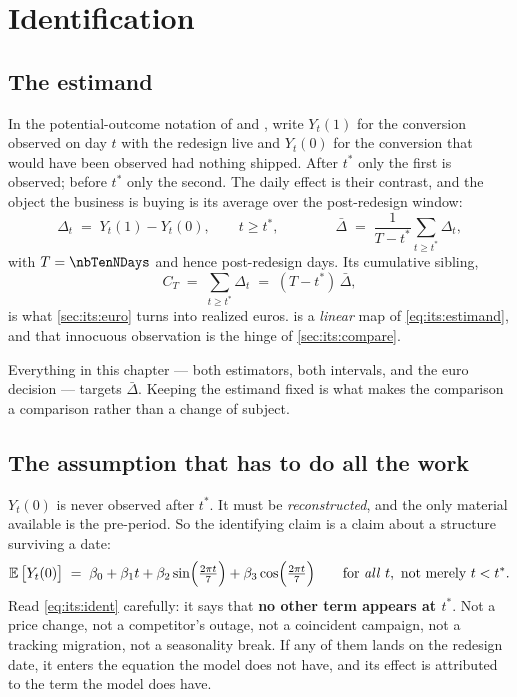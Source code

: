 

\section{Identification}
\label{sec:its:ident}

\subsection*{The estimand}

In the potential-outcome notation of \citet{rubin1974} and \citet{imbens2015}, write $Y_t(1)$ for
the conversion observed on day $t$ with the redesign live and $Y_t(0)$ for the conversion that
would have been observed had nothing shipped. After $t^{*}$ only the first is observed; before
$t^{*}$ only the second. The daily effect is their contrast, and the object the business is buying
is its average over the post-redesign window:
%
\begin{equation}
  \Delta_t \;=\; Y_t(1) - Y_t(0), \qquad t \ge t^{*},
  \qquad\qquad
  \bar\Delta \;=\; \frac{1}{T - t^{*}} \sum_{t \ge t^{*}} \Delta_t ,
  \label{eq:its:estimand}
\end{equation}
%
with $T = \nbTenNDays$ and hence \nbTenNPost{} post-redesign days. Its cumulative sibling,
%
\begin{equation}
  C_T \;=\; \sum_{t \ge t^{*}} \Delta_t \;=\; (T - t^{*})\,\bar\Delta ,
  \label{eq:its:cum}
\end{equation}
%
is what \cref{sec:its:euro} turns into realized euros.  is a \emph{linear} map of
\cref{eq:its:estimand}, and that innocuous observation is the hinge of \cref{sec:its:compare}.

Everything in this chapter --- both estimators, both intervals, and the euro decision --- targets
$\bar\Delta$. Keeping the estimand fixed is what makes the comparison a comparison rather than a
change of subject.

\subsection*{The assumption that has to do all the work}

$Y_t(0)$ is never observed after $t^{*}$. It must be \emph{reconstructed}, and the only material
available is the pre-period. So the identifying claim is a claim about a structure surviving a
date:
%
\begin{equation}
  \operatorname{\mathbb{E}}\big[Y_t(0)\big] \;=\; \beta_0 + \beta_1 t + \beta_2 \sin\!\Big(\tfrac{2\pi t}{7}\Big)
                          + \beta_3 \cos\!\Big(\tfrac{2\pi t}{7}\Big)
  \qquad\text{for \emph{all} } t, \text{ not merely } t < t^{*}.
  \label{eq:its:ident}
\end{equation}
%
Read \cref{eq:its:ident} carefully: it says that \textbf{no other term appears at $t^{*}$}. Not
a price change, not a competitor's outage, not a coincident campaign, not a tracking migration,
not a seasonality break. If any of them lands on the redesign date, it enters the equation the
model does not have, and its effect is attributed to the term the model does have.

